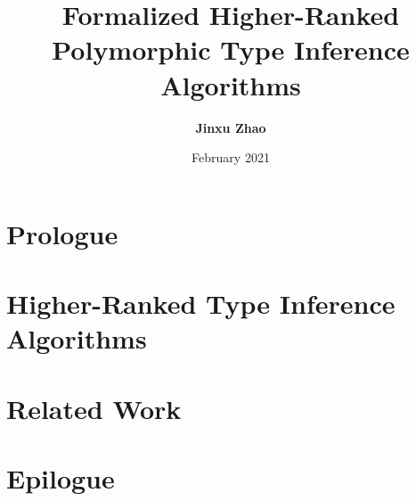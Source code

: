 



\title{Formalized Higher-Ranked Polymorphic Type Inference Algorithms}
\author{\textbf{Jinxu Zhao}}
\date{February 2021}




\maketitle

\begin{abstract}
 
\end{abstract}


\frontmatter
\makedeclaration
\makeAck
\tableofcontents
\listoffigures
\listoftables

\mainmatter

\part{Prologue}





\part{Higher-Ranked Type Inference Algorithms}






\part{Related Work}



\part{Epilogue}





\cleardoublepage




